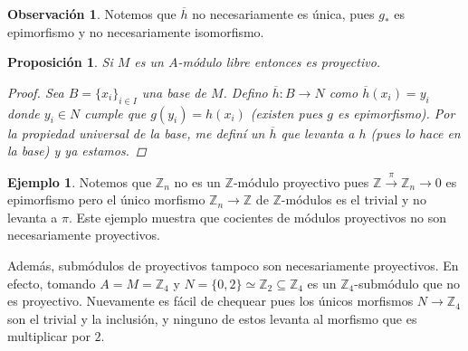 \documentclass[12pt]{book}
\newtheorem{prop}[teo]{Proposición}
\theoremstyle{definition}
\newtheorem{obs}[teo]{Observación}
\newtheorem{ex}[teo]{Ejemplo}
\newcommand{\ZZ}{\mathbb{Z}}      %
\begin{document}
\begin{obs}
Notemos que $\overline{h}$ no necesariamente es única, pues $g_*$ es epimorfismo y no necesariamente isomorfismo.
\end{obs}

\begin{prop}
Si $M$ es un $A$-módulo libre entonces es proyectivo.
\begin{proof}
Sea $B=\{x_i\}_{i\in I}$ una base de $M$. Defino $\overline{h}:B\to N$ como $\overline{h}(x_i)=y_i$ donde $y_i\in N$ cumple que $g(y_i)=h(x_i)$ (existen pues $g$ es epimorfismo). Por la propiedad universal de la base, me definí un $\overline{h}$ que levanta a $h$ (pues lo hace en la base) y ya estamos.
\end{proof}
\end{prop}

\begin{ex}
Notemos que $\ZZ_n$ no es un $\ZZ$-módulo proyectivo pues $\ZZ\stackrel{\pi}{\longrightarrow} \ZZ_n\longrightarrow 0$ es epimorfismo pero el único morfismo $\ZZ_n\to\ZZ$ de $\ZZ$-módulos es el trivial y no levanta a $\pi$. Este ejemplo muestra que cocientes de módulos proyectivos no son necesariamente proyectivos.

Además, submódulos de proyectivos tampoco son necesariamente proyectivos. En efecto, tomando $A=M=\ZZ_4$ y $N=\{0,2\}\simeq \ZZ_2\subseteq \ZZ_4$ es un $\ZZ_4$-submódulo que no es proyectivo. Nuevamente es fácil de chequear pues los únicos morfismos $N\to\ZZ_4$ son el trivial y la inclusión, y ninguno de estos levanta al morfismo que es multiplicar por $2$.
\end{ex}
\end{document}
